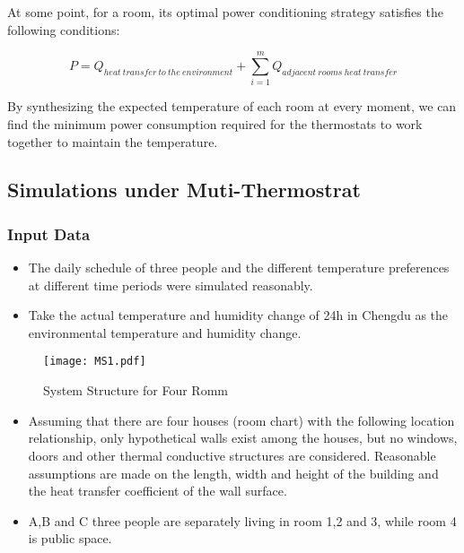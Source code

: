 \documentclass{mcmthesis}
\begin{document}
			At some point, for a room, its optimal power conditioning strategy satisfies the following conditions:
			
			\begin{equation}
				P = Q_{heat\ transfer\ to\ the\ environment} + \sum_{i=1}^m Q_{adjacent\ rooms\ heat\ transfer}
			\end{equation}
			
			By synthesizing the expected temperature of each room at every moment, we can find the minimum power consumption required for the thermostats to work together to maintain the temperature.
			

		\subsection{Simulations under Muti-Thermostrat}
			\subsubsection{Input Data}
			
				
			
				\begin{itemize}
					\item The daily schedule of three people and the different temperature preferences at different time periods were simulated reasonably.
					
					\item Take the actual temperature and humidity change of 24h in Chengdu as the environmental temperature and humidity change.
					
				\end{itemize}
			
				\begin{figure}[h]
					\small
					\centering
					\texttt{[image: MS1.pdf]}
					\caption{System Structure for Four Romm} 
					\label{fig:room}
				\end{figure}
			
				\begin{itemize}	
				
					\item Assuming that there are four houses (room chart) with the following location relationship, only hypothetical walls exist among the houses, but no windows, doors and other thermal conductive structures are considered. Reasonable assumptions are made on the length, width and height of the building and the heat transfer coefficient of the wall surface.
					
					\item A,B and C three people are separately living in room 1,2 and 3, while room 4 is public space.
					
				\end{itemize}
			
\end{document}
